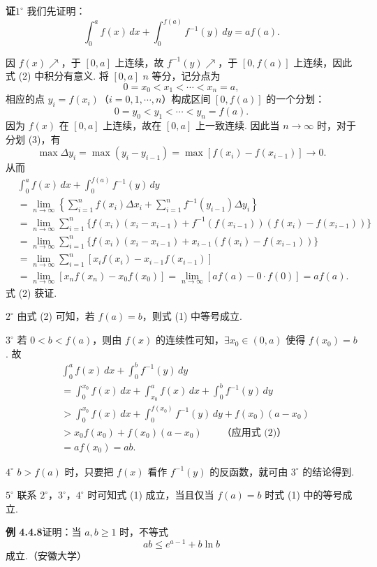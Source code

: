 \documentclass[UTF8,12pt,a4paper,fontset=fandol]{ctexart}
\begin{document}
\noindent\textbf{证}\quad $1^\circ$ 我们先证明：
\[
\int_0^a f(x)\,dx+\int_0^{f(a)}f^{-1}(y)\,dy=af(a). \tag{2}
\]

因 $f(x)\nearrow$，于 $[0,a]$ 上连续，故 $f^{-1}(y)\nearrow$，于 $[0,f(a)]$ 上连续，因此式 (2) 中积分有意义. 将 $[0,a]$ $n$ 等分，记分点为
\[
0=x_0<x_1<\cdots<x_n=a,
\]
相应的点 $y_i=f(x_i)$（$i=0,1,\cdots,n$）构成区间 $[0,f(a)]$ 的一个分划：
\[
0=y_0<y_1<\cdots<y_n=f(a). \tag{3}
\]
因为 $f(x)$ 在 $[0,a]$ 上连续，故在 $[0,a]$ 上一致连续. 因此当 $n\to\infty$ 时，对于分划 (3)，有
\[
\max \Delta y_i=\max (y_i-y_{i-1})
=\max[f(x_i)-f(x_{i-1})]\to0.
\]
从而
\[
\begin{aligned}
&\int_0^a f(x)\,dx+\int_0^{f(a)}f^{-1}(y)\,dy\\
&=\lim_{n\to\infty}\left\{\sum_{i=1}^n f(x_i)\Delta x_i
+\sum_{i=1}^n f^{-1}(y_{i-1})\Delta y_i\right\}\\
&=\lim_{n\to\infty}\sum_{i=1}^n
\{f(x_i)(x_i-x_{i-1})+f^{-1}(f(x_{i-1}))(f(x_i)-f(x_{i-1}))\}\\
&=\lim_{n\to\infty}\sum_{i=1}^n
\{f(x_i)(x_i-x_{i-1})+x_{i-1}(f(x_i)-f(x_{i-1}))\}\\
&=\lim_{n\to\infty}\sum_{i=1}^n[x_i f(x_i)-x_{i-1}f(x_{i-1})]\\
&=\lim_{n\to\infty}[x_n f(x_n)-x_0 f(x_0)]
=\lim_{n\to\infty}[af(a)-0\cdot f(0)]=af(a).
\end{aligned}
\]
式 (2) 获证.

$2^\circ$ 由式 (2) 可知，若 $f(a)=b$，则式 (1) 中等号成立.

$3^\circ$ 若 $0<b<f(a)$，则由 $f(x)$ 的连续性可知，$\exists x_0\in(0,a)$ 使得 $f(x_0)=b$. 故
\[
\begin{aligned}
&\int_0^a f(x)\,dx+\int_0^b f^{-1}(y)\,dy\\
&=\int_0^{x_0}f(x)\,dx+\int_{x_0}^a f(x)\,dx+\int_0^b f^{-1}(y)\,dy\\
&>\int_0^{x_0}f(x)\,dx+\int_0^{f(x_0)}f^{-1}(y)\,dy+f(x_0)(a-x_0)\\
&>x_0f(x_0)+f(x_0)(a-x_0)\qquad\text{（应用式 (2)）}\\
&=af(x_0)=ab.
\end{aligned}
\]

$4^\circ$ $b>f(a)$ 时，只要把 $f(x)$ 看作 $f^{-1}(y)$ 的反函数，就可由 $3^\circ$ 的结论得到.

$5^\circ$ 联系 $2^\circ$，$3^\circ$，$4^\circ$ 时可知式 (1) 成立，当且仅当 $f(a)=b$ 时式 (1) 中的等号成立.

\noindent\textbf{例 4.4.8}\quad 证明：当 $a,b\ge1$ 时，不等式
\[
ab\le e^{a-1}+b\ln b
\]
成立.（安徽大学）
\end{document}
